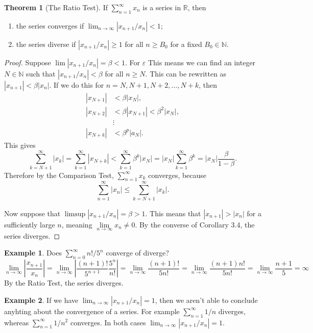 \documentclass{article}
\newcommand{\N}{\mathbb{N}}
\newcommand{\R}{\mathbb{R}}
\theoremstyle{definition}
\newtheorem{theorem}{Theorem}[section]
\newtheorem{example}{Example}[section]
\begin{document}
	\begin{theorem}[The Ratio Test]
		If $ \sum_{n=1}^{\infty}x_n  $ is a series in $ \R $, then
		\begin{enumerate}
			\item the series converges if $ \lim_{n\to\infty}|x_{n+1}/x_n|<1 $;
			\item the series diverse if $ |x_{n+1}/x_n|\ge 1 $ for all $ n\ge B_0 $ for a fixed $ B_0\in\N $.
		\end{enumerate} 
	\end{theorem}
	\begin{proof}
		Suppose $ \lim |x_{n+1}/x_n|=\beta<1 $. For $ \varepsilon $ This means we can find an integer $ N\in\N $ such that $|x_{n+1}/x_n|<\beta $ for all $ n\ge N $. This can be rewritten as $ |x_{n+1}|<\beta|x_n| $. If we do this for $ n=N,N+1,N+2,\ldots ,N+k $, then \begin{align*}
			|x_{N+1}|&<\beta|x_N|,\\
			|x_{N+2}|&<\beta|x_{N+1}|<\beta^2|x_{N}|,\\
			&\vdots\\
			|x_{N+k}|&<\beta^p|a_N|.
		\end{align*}
		This gives $$ \sum_{k=N+1}^{\infty}|x_k|=\sum_{k=1}^{\infty}|x_{N+k}|<\sum_{k=1}^{\infty}\beta^k|x_N|=|x_N|\sum_{k=1}^\infty \beta ^k=|x_N|\frac{\beta}{1-\beta}.$$	Therefore by the Comparison Test, $ \sum_{n=1}^{\infty}x_k $ converges, because $$ \sum_{n=1}^{\infty}|x_n|\le\sum_{k=N+1}^{\infty}|x_k|.$$
		
		Now suppose that $ \limsup|x_{n+1}/x_n|=\beta>1 $. This means that $ |x_{n+1}|>|x_n| $ for a sufficiently large $ n $, meaning $ \lim\limits_{n\to\infty}x_n\neq 0 $. By the converse of Corollary 3.4, the series diverges.  
	\end{proof}
	\begin{example}
		Does $ \sum_{n=0}^{\infty}n!/5^n $ converge of diverge? 
		$$\lim\limits_{n\to\infty}\left\lvert \frac{x_{n+1}}{x_n}\right\rvert=\lim\limits_{n\to\infty}\left\lvert \frac{(n+1)!}{5^{n+1}}\frac{5^n}{n!}\right\rvert=\lim\limits_{n\to\infty}\frac{(n+1)!}{5n!}=\lim\limits_{n\to\infty}\frac{(n+1)n!}{5n!}=\lim\limits_{n\to\infty}\frac{n+1}{5}=\infty$$ By the Ratio Test, the series diverges. 
	\end{example}
	\begin{example}
		If we have $ \lim_{n\to\infty}|x_{n+1}/x_n|=1 $, then we aren't able to conclude anyhting about the convergence of a series. For example $ \sum_{n=1}^{\infty}1/n $ diverges, whereas  $ \sum_{n=1}^{\infty}1/n^2 $ converges. In both cases $ \lim_{n\to\infty}|x_{n+1}/x_n|=1 $. 	
	\end{example}
\end{document}
